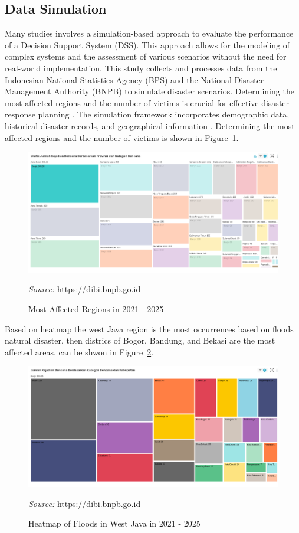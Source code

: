 \documentclass[journal,final,a4paper,twoside,11pt]{IEEEtran}
\begin{document}
\subsection{Data Simulation}

Many studies involves a simulation-based approach to evaluate the performance of a Decision Support System (DSS)\cite{he2020dynamic}. This approach allows for the modeling of complex systems and the assessment of various scenarios without the need for real-world implementation\cite{latchmore2023integrating}. This study collects and processes data from the Indonesian National Statistics Agency (BPS) and the National Disaster Management Authority (BNPB) to simulate disaster scenarios. Determining the most affected regions and the number of victims is crucial for effective disaster response planning \cite{endo2020estimating}. The simulation framework incorporates demographic data, historical disaster records, and geographical information \cite{santos2020workforce}. Determining the most affected regions and the number of victims is shown in Figure~\ref{fig:simulationframework}. 
\begin{figure}[htbp]
    \centerline{\includegraphics[width=0.8\linewidth]{fig4.png}
    }
    \caption{Most Affected Regions in 2021 - 2025}
    \label{fig:simulationframework}
    \footnotesize{\textit{Source:} \url{https://dibi.bnpb.go.id}}
\end{figure}

Based on heatmap the west Java region is the most occurrences based on floods natural disaster, then districs of Bogor, Bandung, and Bekasi are the most affected areas, can be shwon in Figure~\ref{fig:heatmap2}. 
\begin{figure}[htbp]
    \centerline{\includegraphics[width=0.8\linewidth]{fig5.png}}
    \caption{Heatmap of Floods in West Java in 2021 - 2025}
    \label{fig:heatmap2}
    \footnotesize{\textit{Source:} \url{https://dibi.bnpb.go.id}}
\end{figure} 
\end{document}

